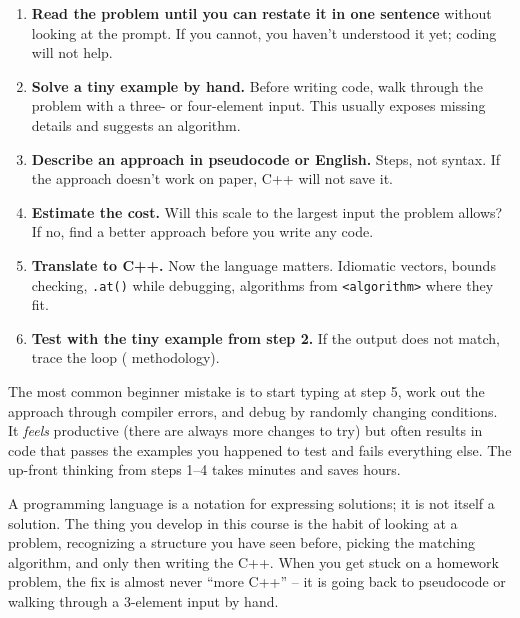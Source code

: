 \documentclass[11pt]{article}
\begin{document}
\begin{enumerate}[leftmargin=*]
    \item \textbf{Read the problem until you can restate it in one
          sentence} without looking at the prompt. If you cannot, you
          haven't understood it yet; coding will not help.
    \item \textbf{Solve a tiny example by hand.} Before writing code,
          walk through the problem with a three- or four-element
          input. This usually exposes missing details and suggests
          an algorithm.
    \item \textbf{Describe an approach in pseudocode or English.}
          Steps, not syntax. If the approach doesn't work on paper,
          C++ will not save it.
    \item \textbf{Estimate the cost.} Will this scale to the largest
          input the problem allows? If no, find a better approach
          before you write any code.
    \item \textbf{Translate to C++.} Now the language matters.
          Idiomatic vectors, bounds checking, \texttt{.at()} while
          debugging, algorithms from \texttt{<algorithm>} where they
          fit.
    \item \textbf{Test with the tiny example from step 2.} If the
          output does not match, trace the loop (
          methodology).
\end{enumerate}

\begin{warnbox}
The most common beginner mistake is to start typing at step 5, work
out the approach through compiler errors, and debug by randomly
changing conditions. It \emph{feels} productive (there are always
more changes to try) but often results in code that passes the
examples you happened to test and fails everything else. The
up-front thinking from steps 1--4 takes minutes and saves hours.
\end{warnbox}

\begin{ideabox}
A programming language is a notation for expressing solutions; it is
not itself a solution. The thing you develop in this course is the
habit of looking at a problem, recognizing a structure you have seen
before, picking the matching algorithm, and only then writing the
C++. When you get stuck on a homework problem, the fix is almost
never ``more C++'' -- it is going back to pseudocode or walking
through a 3-element input by hand.
\end{ideabox}
\end{document}

